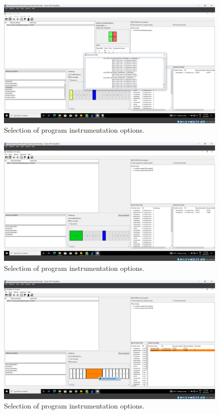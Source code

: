 \documentclass[conference]{IEEEtran}
\begin{document}
\begin{figure}[htbp]
    \centerline{\includegraphics[width=1.0\columnwidth]{images/sch_s7.png}}
    \caption{Selection of program instrumentation options.}
    \label{figure:ap_sch_s7}
\end{figure}

\begin{figure}[htbp]
    \centerline{\includegraphics[width=1.0\columnwidth]{images/sch_s8.png}}
    \caption{Selection of program instrumentation options.}
    \label{figure:ap_sch_s8}
\end{figure}

\begin{figure}[htbp]
    \centerline{\includegraphics[width=1.0\columnwidth]{images/sch_s9.png}}
    \caption{Selection of program instrumentation options.}
    \label{figure:ap_sch_s9}
\end{figure}
\end{document}

